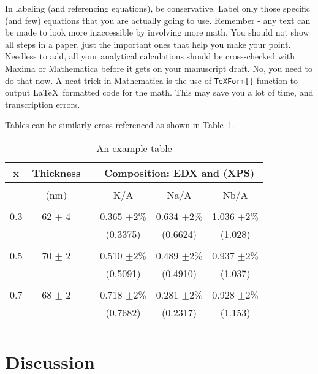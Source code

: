 \documentclass[12 pt]{article}
\begin{document}
In labeling (and referencing equations), be conservative. Label only those specific (and few) equations that you are actually going to use. Remember - any text can be made to look more inaccessible by involving more math. You should not show all steps in a paper, just the important ones that help you make your point. Needless to add, all your analytical calculations should be cross-checked with Maxima or Mathematica before it gets on your manuscript draft. No, you need to do that now. A neat trick in Mathematica is the use of \verb|TeXForm[]| function to output \LaTeX\ formatted code for the math. This may save you a lot of time, and transcription errors.

Tables can be similarly cross-referenced as shown in Table~\ref{tbl:ratio}.

\begin{table}
  \caption{An example table}
  \label{tbl:ratio}
  \begin{center}
    \begin{tabular}{cccccc}
      x  & Thickness & & \multicolumn{3}{c}{Composition: EDX and (XPS)} \\
      \hline \\
         & (nm) & & K/A & Na/A & Nb/A \\
      \hline \\
      0.3 & 62 $\pm$ 4 & & 0.365 $\pm 2\%$ & 0.634 $\pm 2\%$ & 1.036 $\pm 2\%$ \\
         & & & (0.3375) & (0.6624) & (1.028) \\
      \hline \\
      0.5 & 70 $\pm$ 2 & & 0.510 $\pm 2\%$ & 0.489 $\pm 2\%$ & 0.937 $\pm 2\%$ \\
         & & & (0.5091) & (0.4910) & (1.037) \\
      \hline \\
      0.7 & 68 $\pm$ 2 & & 0.718 $\pm 2\%$ & 0.281 $\pm 2\%$ & 0.928 $\pm 2\%$ \\
         & & & (0.7682) & (0.2317) & (1.153) \\
      \hline \\
    \end{tabular}
  \end{center}
\end{table}

\section{Discussion}
\label{sec:discussion}
\end{document}
